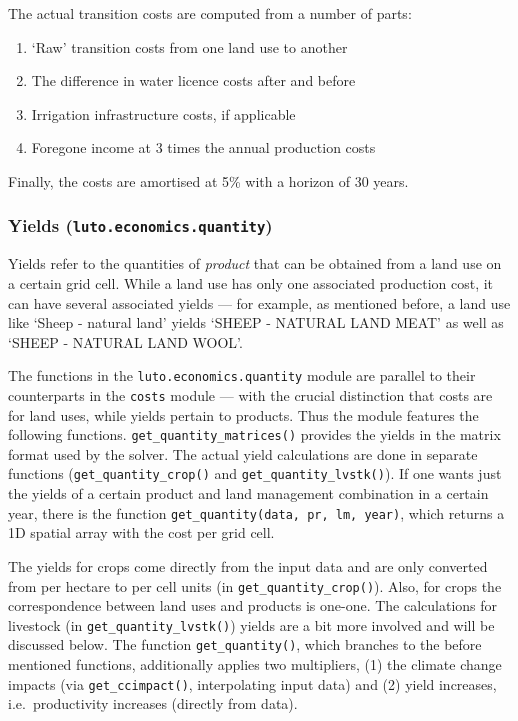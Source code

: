 \documentclass{draft}
\begin{document}
The actual transition costs are computed from a number of parts:
\begin{enumerate}
	\item `Raw' transition costs from one land use to another
	\item The difference in water licence costs after and before
	\item Irrigation infrastructure costs, if applicable
	\item Foregone income at 3 times the annual production costs
\end{enumerate}

Finally, the costs are amortised at 5\% with a horizon of 30 years.

\subsubsection{Yields (\texttt{luto.economics.quantity})}

Yields refer to the quantities of \emph{product} that can be obtained from a land use on a certain grid cell. While a land use has only one associated production cost, it can have several associated yields --- for example, as mentioned before, a land use like `Sheep - natural land' yields `SHEEP - NATURAL LAND MEAT' as well as `SHEEP - NATURAL LAND WOOL'.

The functions in the \texttt{luto.economics.quantity} module are parallel to their counterparts in the \texttt{costs} module --- with the crucial distinction that costs are for land uses, while yields pertain to products. Thus the module features the following functions. \texttt{get_quantity_matrices()} provides the yields in the matrix format used by the solver. The actual yield calculations are done in separate functions (\texttt{get_quantity_crop()} and \texttt{get_quantity_lvstk()}). If one wants just the yields of a certain product and land management combination in a certain year, there is the function \texttt{get_quantity(data, pr, lm, year)}, which returns a 1D spatial array with the cost per grid cell.

The yields for crops come directly from the input data and are only converted from per hectare to per cell units (in \texttt{get_quantity_crop()}). Also, for crops the correspondence between land uses and products is one-one. The calculations for livestock (in \texttt{get_quantity_lvstk()}) yields are a bit more involved and will be discussed below. The function \texttt{get_quantity()}, which branches to the before mentioned functions, additionally applies two multipliers, (1) the climate change impacts (via \texttt{get_ccimpact()}, interpolating input data) and (2) yield increases, i.e.\ productivity increases (directly from data).
\end{document}
